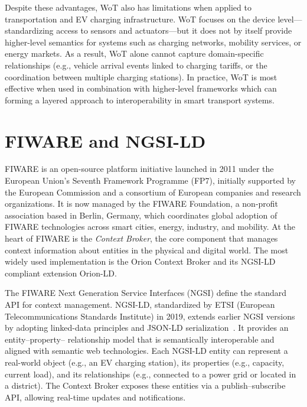 Despite these advantages, WoT also has limitations when applied to
transportation and EV charging infrastructure. WoT focuses on the
device level—standardizing access to sensors and actuators—but it
does not by itself provide higher-level semantics for systems such as
charging networks, mobility services, or energy markets. As a result,
WoT alone cannot capture domain-specific relationships (e.g., vehicle
arrival events linked to charging tariffs, or the coordination between
multiple charging stations). In practice, WoT is most effective when
used in combination with higher-level frameworks which can
forming a layered approach to interoperability in smart transport
systems.

\section{FIWARE and NGSI-LD}

FIWARE is an open-source platform initiative launched in 2011 under
the European Union’s Seventh Framework Programme (FP7), initially
supported by the European Commission and a consortium of European
companies and research organizations. It is now managed by the
FIWARE Foundation, a non-profit association based in Berlin, Germany,
which coordinates global adoption of FIWARE technologies across smart
cities, energy, industry, and mobility. At the heart of FIWARE is the
\emph{Context Broker}, the core component that manages context
information about entities in the physical and digital world. The most
widely used implementation is the Orion Context Broker and its
NGSI-LD compliant extension Orion-LD.

The FIWARE Next Generation Service Interfaces (NGSI) define the
standard API for context management. NGSI-LD, standardized by ETSI
(European Telecommunications Standards Institute) in 2019, extends
earlier NGSI versions by adopting linked-data principles and JSON-LD
serialization~\cite{ETSI2019NGSILD}. It provides an entity–property–
relationship model that is semantically interoperable and aligned with
semantic web technologies. Each NGSI-LD entity can represent a
real-world object (e.g., an EV charging station), its properties (e.g.,
capacity, current load), and its relationships (e.g., connected to a power
grid or located in a district). The Context Broker exposes these entities
via a publish–subscribe API, allowing real-time updates and
notifications.

